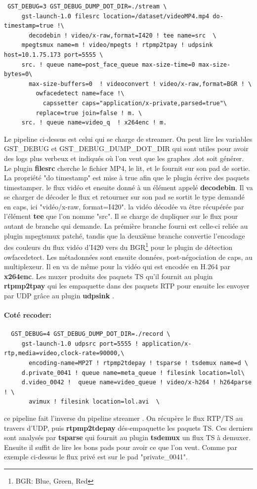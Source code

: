 \begin{verbatim}
 GST_DEBUG=3 GST_DEBUG_DUMP_DOT_DIR=./stream \
	 gst-launch-1.0 filesrc location=/dataset/videoMP4.mp4 do-timestamp=true !\
	   decodebin ! video/x-raw,format=I420 ! tee name=src  \
	 mpegtsmux name=m ! video/mpegts ! rtpmp2tpay ! udpsink host=10.1.75.173 port=5555 \
	 src. ! queue name=post_face_queue max-size-time=0 max-size-bytes=0\
	   max-size-buffers=0  ! videoconvert ! video/x-raw,format=BGR ! \
	     owfacedetect name=face !\
	       capssetter caps="application/x-private,parsed=true"\
		 replace=true join=false ! m. \
	 src. ! queue name=video_q  ! x264enc ! m.
\end{verbatim}
Le pipeline ci-dessus est celui qui se charge de streamer. On peut lire les variables GST\_DEBUG et GST\_DEBUG\_DUMP\_DOT\_DIR qui sont utiles pour avoir des logs plus verbeux et indiqués où l'on veut que les graphes .dot soit générer. Le plugin \textbf{filesrc} cherche le fichier MP4, le lit, et le fournit sur son pad de sortie. La propriété "do timestamp" est mise à true afin que le plugin écrive des paquets timestamper. le flux vidéo et ensuite donné à un élément appelé \textbf{decodebin}. Il va se charger de décoder le flux et retourner sur son pad se sortit le type demandé en caps, ici "vidéo/x-raw, format=I420". la vidéo décodée va être récupérée par l'élément \textbf{tee} que l'on nomme "src". Il se charge de dupliquer sur le flux pour autant de branche qui demande. La prémière branche fourni est celle-ci reliée au plugin mpegtsmux patché, tandis que la deuxième branche convertie l'encodage des couleurs du flux vidéo d'I420 vers du BGR\footnote{BGR: Blue, Green, Red} pour le plugin de détection owfacedetect. Les métadonnées sont ensuite données, post-négociation de caps, au multiplexeur. Il en va de même pour la vidéo qui est encodée en H.264 par \textbf{x264enc}. Les muxer produits des paquets TS qu'il fournit au plugin \textbf{rtpmp2tpay} qui les empaquette dans des paquets RTP pour ensuite les envoyer par UDP grâce au plugin \textbf{udpsink} .


\paragraph{Coté recoder: }

\begin{verbatim}
  GST_DEBUG=4 GST_DEBUG_DUMP_DOT_DIR=./record \
	 gst-launch-1.0 udpsrc port=5555 ! application/x-rtp,media=video,clock-rate=90000,\
	   encoding-name=MP2T ! rtpmp2tdepay ! tsparse ! tsdemux name=d \
	 d.private_0041 ! queue name=meta_queue ! filesink location=lol\
	 d.video_0042 !  queue name=video_queue ! video/x-h264 ! h264parse ! \
	   avimux ! filesink location=lol.avi  \
\end{verbatim}
ce pipeline fait l'inverse du pipeline streamer . On récupère le flux RTP/TS au travers d'UDP, puis \textbf{rtpmp2tdepay} dés-empaquette les paquets TS. Ces derniers sont analysés par \textbf{tsparse} qui fournit au plugin \textbf{tsdemux} un flux TS à demuxer. Ensuite il suffit de lire les bons pads pour avoir ce que l'on veut. Comme par exemple ci-dessus le flux privé est sur le pad "private\_0041".

